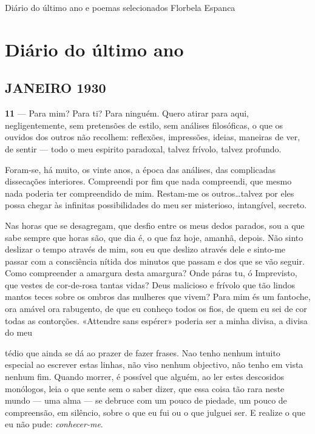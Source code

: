 
Diário do último ano e poemas selecionados 
Florbela Espanca


\section{Diário do último ano}

\pagebreak

\subsection{JANEIRO 1930}


\textbf{11} — Para mim? Para ti? Para ninguém. Quero atirar
para aqui, negligentemente, sem pretensões de estilo,
sem análises filosóficas, o que os ouvidos dos outros
não recolhem: reflexões, impressões, ideias, maneiras
de ver, de sentir — todo o meu espirito paradoxal,
talvez frívolo, talvez profundo.

Foram-se, há muito, os vinte anos, a época das análises,
das complicadas dissecações interiores. Compreendi por
fim que nada compreendi, que mesmo nada poderia ter
compreendido de mim. Restam-me os outros\ldots talvez
por eles possa chegar às infinitas possibilidades do meu
ser misterioso, intangível, secreto.

Nas horas que se desagregam, que desfio entre os meus
dedos parados, sou a que sabe sempre que horas são,
que dia é, o que faz hoje, amanhã, depois. Não sinto
deslizar o tempo através de mim, sou eu que deslizo
através dele e sinto-me passar com a consciência
nítida dos minutos que passam e dos que se vão
seguir. Como compreender a amargura desta 
amargura? Onde páras tu, ó Imprevisto, que vestes de
cor-de-rosa tantas vidas? Deus malicioso e frívolo que
tão lindos mantos teces sobre os ombros das mulheres
que vivem? Para mim és um fantoche, ora amável
ora rabugento, de que eu conheço todos os fios, de
quem eu sei de cor todas as contorções. «Attendre sans
espérer» poderia ser a minha divisa, a divisa do meu


\pagebreak



tédio que ainda se dá ao prazer de fazer frases.
Nao tenho nenhum intuito especial ao escrever estas
linhas, não viso nenhum objectivo, não tenho em vista
nenhum fim. Quando morrer, é possível que alguém,
ao ler estes descosidos monólogos, leia o que sente
sem o saber dizer, que essa coisa tão rara neste mundo
— uma alma — se debruce com um pouco de piedade,
um pouco de compreensão, em silêncio, sobre o que eu
fui ou o que julguei ser. E realize o que eu não pude:
\textit{conhecer-me}.

